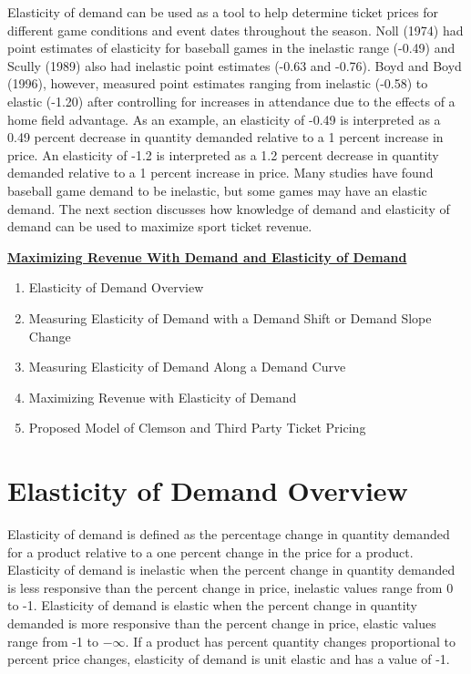 \documentclass[preprint,12pt,times]{elsarticle}
\begin{document}
Elasticity of demand can be used as a tool to help determine ticket prices for different game conditions and event dates throughout the season.  Noll (1974) had point estimates of elasticity for baseball games in the inelastic range (-0.49) and Scully (1989) also had inelastic point estimates (-0.63 and -0.76).  Boyd and Boyd (1996), however, measured point estimates ranging from inelastic (-0.58) to elastic (-1.20) after controlling for increases in attendance due to the effects of a home field advantage.  As an example, an elasticity of -0.49 is interpreted as a 0.49 percent decrease in quantity demanded relative to a 1 percent increase in price.  An elasticity of -1.2 is interpreted as a 1.2 percent decrease in quantity demanded relative to a 1 percent increase in price. Many studies have found baseball game demand to be inelastic, but some games may have an elastic demand.  The next section discusses how knowledge of demand and elasticity of demand can be used to maximize sport ticket revenue.\\

\begin{Large}
\noindent\textbf{\ul{Maximizing Revenue With Demand and Elasticity of Demand}}
\end{Large}
\begin{large}
\begin{enumerate}
  \item Elasticity of Demand Overview
  \item Measuring Elasticity of Demand with a Demand Shift or Demand Slope Change
  \item Measuring Elasticity of Demand Along a Demand Curve
  \item Maximizing Revenue with Elasticity of Demand
  \item Proposed Model of Clemson and Third Party Ticket Pricing
\end{enumerate}
\end{large}

\section {\textbf{Elasticity of Demand Overview}}

Elasticity of demand is defined as the percentage change in quantity demanded for a product relative to a one percent change in the price for a product. Elasticity of demand is inelastic when the percent change in quantity demanded is less responsive than the percent change in price, inelastic values  range from 0 to -1.  Elasticity of demand is elastic when the percent change in quantity demanded is more responsive than the percent change in price, elastic values range from -1 to $-\infty$.  If a product has percent quantity changes proportional to percent price changes, elasticity of demand is unit elastic and has a value of -1.
\end{document}
